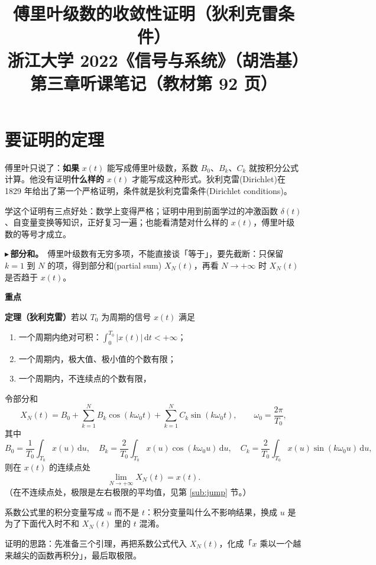 \documentclass[UTF8,a4paper,11pt]{ctexart}
\title{傅里叶级数的收敛性证明（狄利克雷条件）\\\large 浙江大学 2022《信号与系统》（胡浩基）第三章听课笔记（教材第 92 页）}
\author{}
\date{}
\newenvironment{remember}{\begin{rememberbox}\textbf{重点}\par\smallskip}{\end{rememberbox}}
\newcounter{ex}[section]
\newcommand{\point}[1]{\par\addvspace{1ex}\noindent\textcolor{ptteal}{$\blacktriangleright$\,\textbf{#1}}\ }
\begin{document}
\pagestyle{plain}
\maketitle

\section{要证明的定理}\label{sec:thm}
傅里叶只说了：\textbf{如果} $x(t)$ 能写成傅里叶级数，系数 $B_0$、$B_k$、$C_k$ 就按积分公式计算。他没有证明\textbf{什么样的} $x(t)$ 才能写成这种形式。狄利克雷(Dirichlet)在 1829 年给出了第一个严格证明，条件就是狄利克雷条件(Dirichlet conditions)。

学这个证明有三点好处：数学上变得严格；证明中用到前面学过的冲激函数 $\delta(t)$、自变量变换等知识，正好复习一遍；也能看清楚对什么样的 $x(t)$，傅里叶级数的等号才成立。

\point{部分和。}傅里叶级数有无穷多项，不能直接谈「等于」，要先截断：只保留 $k=1$ 到 $N$ 的项，得到部分和(partial sum) $X_N(t)$，再看 $N\to+\infty$ 时 $X_N(t)$ 是否趋于 $x(t)$。

\begin{remember}
\textbf{定理（狄利克雷）}\quad 若以 $T_0$ 为周期的信号 $x(t)$ 满足
\begin{enumerate}[nosep,label=\textcircled{\scriptsize\arabic*}]
\item 一个周期内绝对可积：$\displaystyle\int_0^{T_0}|x(t)|\,\mathrm{d}t<+\infty$；
\item 一个周期内，极大值、极小值的个数有限；
\item 一个周期内，不连续点的个数有限，
\end{enumerate}
令部分和
\[
X_N(t)=B_0+\sum_{k=1}^{N}B_k\cos(k\omega_0t)+\sum_{k=1}^{N}C_k\sin(k\omega_0t),\qquad \omega_0=\frac{2\pi}{T_0},
\]
其中
\[
B_0=\frac{1}{T_0}\int_{T_0}x(u)\,\mathrm{d}u,\quad
B_k=\frac{2}{T_0}\int_{T_0}x(u)\cos(k\omega_0u)\,\mathrm{d}u,\quad
C_k=\frac{2}{T_0}\int_{T_0}x(u)\sin(k\omega_0u)\,\mathrm{d}u,
\]
则在 $x(t)$ 的连续点处
\[
\lim_{N\to+\infty}X_N(t)=x(t).
\]
（在不连续点处，极限是左右极限的平均值，见第 \ref{sub:jump} 节。）
\end{remember}

系数公式里的积分变量写成 $u$ 而不是 $t$：积分变量叫什么不影响结果，换成 $u$ 是为了下面代入时不和 $X_N(t)$ 里的 $t$ 混淆。

证明的思路：先准备三个引理，再把系数公式代入 $X_N(t)$，化成「$x$ 乘以一个越来越尖的函数再积分」，最后取极限。
\end{document}

